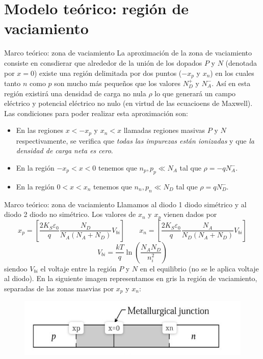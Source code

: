 \documentclass[aspectratio=169,xcolor=dvipsnames]{beamer}
\newcommand{\parentesis}[1]{\left( #1  \right)}
\newcommand{\ccorchetes}[1]{\left[ #1  \right]}
\begin{document}
\section{Modelo teórico: región de vaciamiento}

\begin{frame}{Marco teórico: zona de vaciamiento}
    La aproximación de la zona de vaciamiento consiste en consdierar que alrededor de la unión de los dopados $P$ y $N$  (denotada por $x=0$) existe una región delimitada por dos puntos ($-x_p$ y $x_n$) en los cuales tanto $n$ como $p$ son mucho más pequeños que los valores $N_D^+$ y $N_A^-$. Así en esta región existirá una densidad de carga no nula $\rho$ lo que generará un campo eléctrico y potencial eléctrico no nulo (en virtud de las ecuacioens de Maxwell). Las condiciones para poder realizar esta aproximación son:

    \begin{itemize}
        \item En las regiones $x<-x_p$ y $x_n<x$ llamadas regiones masivas $P$ y $N$ respectivamente, se verifica que \textit{todas las impurezas están ionizadas} y que \textit{la densidad de carga neta es cero}.
        \item En la región $-x_p<x<0$ tenemos que $n_p,p_p\ll N_A$ tal que $\rho=-qN_A^-$.
        \item En la región $0<x<x_n$ tenemos que $n_n,p_n\ll N_D$ tal que $\rho=qN_D^-$.
    \end{itemize} 
\end{frame}

\begin{frame}{Marco teórico: zona de vaciamiento}
    Llamamos al diodo 1 diodo simétrico y al diodo 2 diodo no simétrico. Los valores de $x_n$ y $x_p$ vienen dados por
    \begin{equation*}
        x_p = \ccorchetes{\frac{2K_S\varepsilon_0}{q} \frac{N_D}{N_A(N_A+N_D)}  V_{bi}}   \qquad 
        x_n = \ccorchetes{\frac{2K_S\varepsilon_0}{q} \frac{N_A}{N_D(N_A+N_D)}  V_{bi}}
    \end{equation*}
    \begin{equation*}
        V_{bi} = \frac{kT}{q} \ln \parentesis{\frac{N_AN_D}{n_i^2}} 
    \end{equation*}
    siendoo $V_{bi}$ el voltaje entre la región $P$ y $N$ en el equilibrio (no se le aplica voltaje al diodo). En la siguiente imagen representamos en gris la región de vaciamiento, separadas de las zonas masvias por $x_p$ y $x_n$:
    \begin{figure} 
        \includegraphics[width=0.5\linewidth]{Foto_Union.jpeg}
    \end{figure}
\end{frame}
\end{document}
